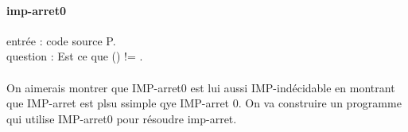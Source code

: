 \documentclass{report}
\begin{document}
\paragraph{imp-arret0}entrée : code source P.\\question : Est ce que \phi(\epsilon) != \perp.\\\\On aimerais montrer que IMP-arret0 est lui aussi IMP-indécidable en montrant que IMP-arret est plsu ssimple qye IMP-arret 0. On va construire un programme qui utilise IMP-arret0  pour résoudre imp-arret.
\end{document}
